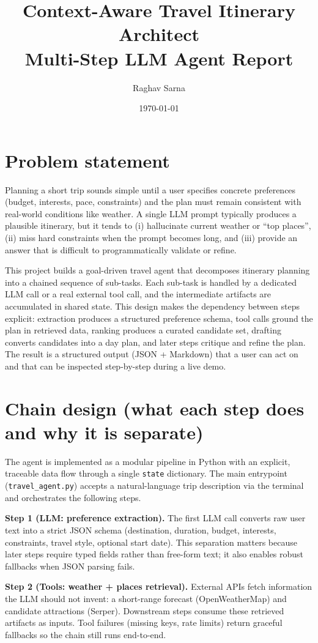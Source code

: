 \documentclass[10pt]{article}
\title{Context-Aware Travel Itinerary Architect\\\large Multi-Step LLM Agent Report}
\author{Raghav Sarna}
\date{\today}
\begin{document}
\maketitle

\section{Problem statement}
Planning a short trip sounds simple until a user specifies concrete preferences (budget, interests, pace, constraints) and the plan must remain consistent with real-world conditions like weather. A single LLM prompt typically produces a plausible itinerary, but it tends to (i) hallucinate current weather or ``top places'', (ii) miss hard constraints when the prompt becomes long, and (iii) provide an answer that is difficult to programmatically validate or refine.

This project builds a goal-driven travel agent that decomposes itinerary planning into a chained sequence of sub-tasks. Each sub-task is handled by a dedicated LLM call or a real external tool call, and the intermediate artifacts are accumulated in shared state. This design makes the dependency between steps explicit: extraction produces a structured preference schema, tool calls ground the plan in retrieved data, ranking produces a curated candidate set, drafting converts candidates into a day plan, and later steps critique and refine the plan. The result is a structured output (JSON + Markdown) that a user can act on and that can be inspected step-by-step during a live demo.

\section{Chain design (what each step does and why it is separate)}
The agent is implemented as a modular pipeline in Python with an explicit, traceable data flow through a single \texttt{state} dictionary. The main entrypoint (\texttt{travel\_agent.py}) accepts a natural-language trip description via the terminal and orchestrates the following steps.

\textbf{Step 1 (LLM: preference extraction).} The first LLM call converts raw user text into a strict JSON schema (destination, duration, budget, interests, constraints, travel style, optional start date). This separation matters because later steps require typed fields rather than free-form text; it also enables robust fallbacks when JSON parsing fails.

\textbf{Step 2 (Tools: weather + places retrieval).} External APIs fetch information the LLM should not invent: a short-range forecast (OpenWeatherMap) and candidate attractions (Serper). Downstream steps consume these retrieved artifacts as inputs. Tool failures (missing keys, rate limits) return graceful fallbacks so the chain still runs end-to-end.
\end{document}
